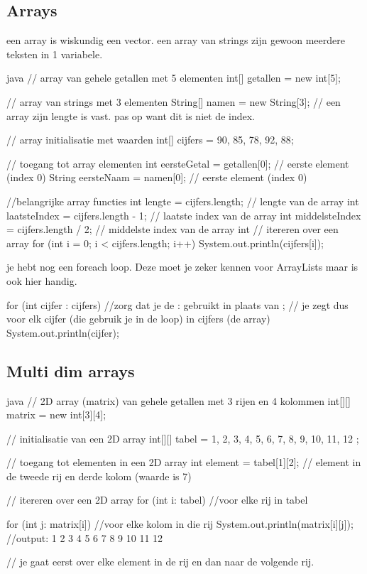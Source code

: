 \documentclass[a4paper,11pt]{article}
\begin{document}
\subsection{Arrays}

een array is wiskundig een vector.
een array van strings zijn gewoon meerdere teksten in 1 variabele.
\begin{codeblock}[array]{java}
    // array van gehele getallen met 5 elementen
    int[] getallen = new int[5];

    // array van strings met 3 elementen
    String[] namen = new String[3]; // een array zijn lengte is vast. pas op want dit is niet de index.

    // array initialisatie met waarden
    int[] cijfers = {90, 85, 78, 92, 88};

    // toegang tot array elementen
    int eersteGetal = getallen[0]; // eerste element (index 0) 
    String eersteNaam = namen[0]; // eerste element (index 0)

    //belangrijke array functies
    int lengte = cijfers.length; // lengte van de array
    int laatsteIndex = cijfers.length - 1; // laatste index van de array
    int middelsteIndex = cijfers.length / 2; // middelste index van de array
    int 
    // itereren over een array
    for (int i = 0; i < cijfers.length; i++) {
        System.out.println(cijfers[i]);
    }

    je hebt nog een foreach loop. Deze moet je zeker kennen voor ArrayLists maar
    is ook hier handig.

    for (int cijfer : cijfers) //zorg dat je de : gebruikt in plaats van ;
    // je zegt dus voor elk cijfer (die gebruik je in de loop) in cijfers (de array)
    {
        System.out.println(cijfer);
    }
\end{codeblock}


\subsection{Multi dim arrays}

\begin{codeblock}{java}
    // 2D array (matrix) van gehele getallen met 3 rijen en 4 kolommen
    int[][] matrix = new int[3][4];

    // initialisatie van een 2D array
    int[][] tabel = {
        {1, 2, 3, 4},
        {5, 6, 7, 8},
        {9, 10, 11, 12}
    };

    // toegang tot elementen in een 2D array
    int element = tabel[1][2]; // element in de tweede rij en derde kolom (waarde is 7)

    // itereren over een 2D array
    for (int i: tabel) //voor elke rij in tabel
    {
        for (int j: matrix[i]) //voor elke kolom in die rij
        {
            System.out.println(matrix[i][j]);
            //output: 1 2 3 4 5 6 7 8 9 10 11 12
        }

        // je gaat eerst over elke element in de rij en 
        dan naar de volgende rij.
    }
\end{codeblock}
\end{document}

